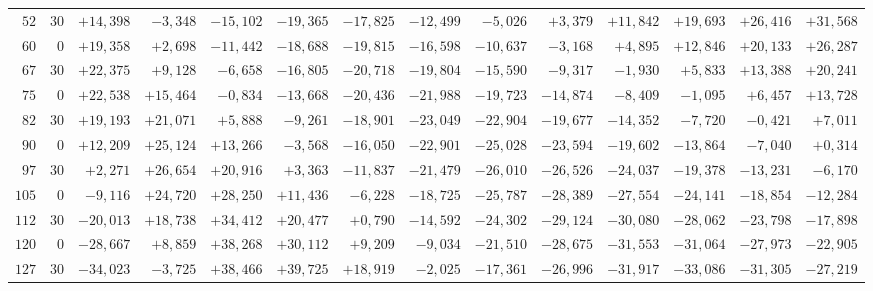 \begin{landscape}
\begin{longtable}{@{}rr|r|r|r|r|r|r|r|r|r|r|r|r@{}}
\(52\) & \(30\) & \(+14{,}398\) & \(-3{,}348\) & \(-15{,}102\) & \(-19{,}365\) & \(-17{,}825\) & \(-12{,}499\) & \(-5{,}026\) & \(+3{,}379\) & \(+11{,}842\) & \(+19{,}693\) & \(+26{,}416\) & \(+31{,}568\)\\[2pt]
\(60\) & \(0\) & \(+19{,}358\) & \(+2{,}698\) & \(-11{,}442\) & \(-18{,}688\) & \(-19{,}815\) & \(-16{,}598\) & \(-10{,}637\) & \(-3{,}168\) & \(+4{,}895\) & \(+12{,}846\) & \(+20{,}133\) & \(+26{,}287\)\\
\(67\) & \(30\) & \(+22{,}375\) & \(+9{,}128\) & \(-6{,}658\) & \(-16{,}805\) & \(-20{,}718\) & \(-19{,}804\) & \(-15{,}590\) & \(-9{,}317\) & \(-1{,}930\) & \(+5{,}833\) & \(+13{,}388\) & \(+20{,}241\)\\
\(75\) & \(0\) & \(+22{,}538\) & \(+15{,}464\) & \(-0{,}834\) & \(-13{,}668\) & \(-20{,}436\) & \(-21{,}988\) & \(-19{,}723\) & \(-14{,}874\) & \(-8{,}409\) & \(-1{,}095\) & \(+6{,}457\) & \(+13{,}728\)\\
\(82\) & \(30\) & \(+19{,}193\) & \(+21{,}071\) & \(+5{,}888\) & \(-9{,}261\) & \(-18{,}901\) & \(-23{,}049\) & \(-22{,}904\) & \(-19{,}677\) & \(-14{,}352\) & \(-7{,}720\) & \(-0{,}421\) & \(+7{,}011\)\\[2pt]
\(90\) & \(0\) & \(+12{,}209\) & \(+25{,}124\) & \(+13{,}266\) & \(-3{,}568\) & \(-16{,}050\) & \(-22{,}901\) & \(-25{,}028\) & \(-23{,}594\) & \(-19{,}602\) & \(-13{,}864\) & \(-7{,}040\) & \(+0{,}314\)\\
\(97\) & \(30\) & \(+2{,}271\) & \(+26{,}654\) & \(+20{,}916\) & \(+3{,}363\) & \(-11{,}837\) & \(-21{,}479\) & \(-26{,}010\) & \(-26{,}526\) & \(-24{,}037\) & \(-19{,}378\) & \(-13{,}231\) & \(-6{,}170\)\\
\(105\) & \(0\) & \(-9{,}116\) & \(+24{,}720\) & \(+28{,}250\) & \(+11{,}436\) & \(-6{,}228\) & \(-18{,}725\) & \(-25{,}787\) & \(-28{,}389\) & \(-27{,}554\) & \(-24{,}141\) & \(-18{,}854\) & \(-12{,}284\)\\
\(112\) & \(30\) & \(-20{,}013\) & \(+18{,}738\) & \(+34{,}412\) & \(+20{,}477\) & \(+0{,}790\) & \(-14{,}592\) & \(-24{,}302\) & \(-29{,}124\) & \(-30{,}080\) & \(-28{,}062\) & \(-23{,}798\) & \(-17{,}898\)\\[2pt]
\(120\) & \(0\) & \(-28{,}667\) & \(+8{,}859\) & \(+38{,}268\) & \(+30{,}112\) & \(+9{,}209\) & \(-9{,}034\) & \(-21{,}510\) & \(-28{,}675\) & \(-31{,}553\) & \(-31{,}064\) & \(-27{,}973\) & \(-22{,}905\)\\
\(127\) & \(30\) & \(-34{,}023\) & \(-3{,}725\) & \(+38{,}466\) & \(+39{,}725\) & \(+18{,}919\) & \(-2{,}025\) & \(-17{,}361\) & \(-26{,}996\) & \(-31{,}917\) & \(-33{,}086\) & \(-31{,}305\) & \(-27{,}219\)\\

\end{longtable}
\end{landscape}
